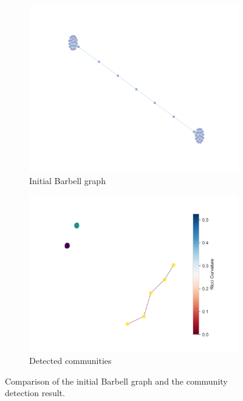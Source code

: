 \documentclass[12pt,a4paper]{article}
\begin{document}
\begin{figure}[ht]
    \centering
    \begin{subfigure}[b]{0.45\textwidth}
        \centering
        \includegraphics[width=\textwidth]{ToyModelResults/Barbell_resluts/BeforeRicciFlow.png}
        \caption{Initial Barbell graph}
        \label{fig:barbell_initial}
    \end{subfigure}
    \hfill
    \begin{subfigure}[b]{0.45\textwidth}
        \centering
        \includegraphics[width=\textwidth]{ToyModelResults/Barbell_resluts/Communities.png}
        \caption{Detected communities}
        \label{fig:barbell_result}
    \end{subfigure}
    \caption{Comparison of the initial Barbell graph and the community detection result.}
    \label{fig3}
\end{figure}
\end{document}
